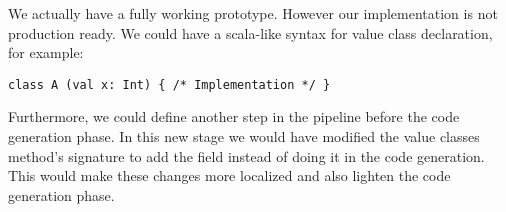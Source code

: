 We actually have a fully working prototype. However our implementation is not production ready. 
We could have a scala-like syntax for value class declaration, for example:
\begin{lstlisting}
class A (val x: Int) { /* Implementation */ }
\end{lstlisting}
Furthermore, we could define another step in the pipeline before the code generation phase. 
In this new stage we would have modified the value classes method's signature to add the field instead of doing it in the code generation. 
This would make these changes more localized and also lighten the code generation phase.
